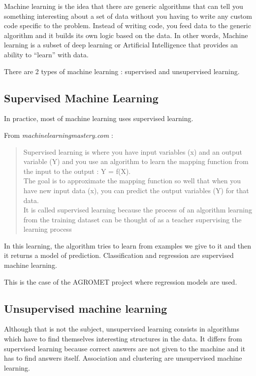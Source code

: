 \documentclass[12pt,twoside]{reedthesis}
\theoremstyle{definition}
\theoremstyle{definition}
\theoremstyle{definition}
\theoremstyle{remark}
\begin{document}
Machine learning is the idea that there are generic algorithms that can
tell you something interesting about a set of data without you having to
write any custom code specific to the problem. Instead of writing code,
you feed data to the generic algorithm and it builds its own logic based
on the data. In other words, Machine learning is a subset of deep
learning or Artificial Intelligence that provides an ability to
``learn'' with data.

There are 2 types of machine learning : supervised and unsupervised
learning.

\subsection{Supervised Machine
Learning}\label{supervised-machine-learning}

In practice, most of machine learning uses supervised learning.

From \emph{machinelearningmastery.com} :
\begin{quote}
Supervised learning is where you have input variables (x) and an output
variable (Y) and you use an algorithm to learn the mapping function from
the input to the output : Y = f(X).\\
The goal is to approximate the mapping function so well that when you
have new input data (x), you can predict the output variables (Y) for
that data.\\
It is called supervised learning because the process of an algorithm
learning from the training dataset can be thought of as a teacher
supervising the learning process
\end{quote}
In this learning, the algorithm tries to learn from examples we give to
it and then it returns a model of prediction. Classification and
regression are supervised machine learning.

This is the case of the AGROMET project where regression models are
used.

\subsection{Unsupervised machine
learning}\label{unsupervised-machine-learning}

Although that is not the subject, unsupervised learning consists in
algorithms which have to find themselves interesting structures in the
data. It differs from supervised learning because correct answers are
not given to the machine and it has to find answers itself. Association
and clustering are unsupervised machine learning.
\end{document}
